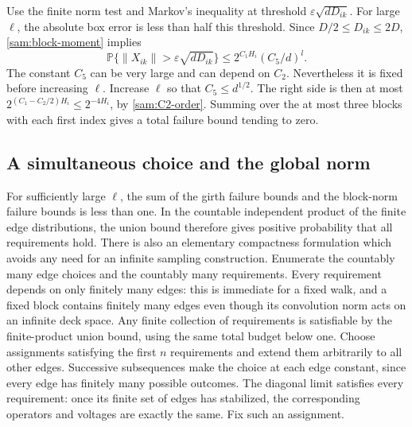 Use the finite norm test and Markov's inequality at threshold
\(\varepsilon\sqrt{dD_{ik}}\).  For large \(\ell\), the absolute
box error is less than half this threshold.  Since
\(D/2\le D_{ik}\le2D\), \eqref{sam:block-moment} implies
\begin{equation}\label{sam:block-probability}
 \mathbb P\{\|X_{ik}\|>
                   \varepsilon\sqrt{dD_{ik}}\}
 \le 2^{C_1H_i}(C_5/d)^l.
\end{equation}
The constant \(C_5\) can be very large and can depend on \(C_2\).
Nevertheless it is fixed before increasing \(\ell\).  Increase
\(\ell\) so that \(C_5\le d^{1/2}\).  The right side is then
at most
\(2^{(C_1-C_2/2)H_i}\le2^{-4H_i}\), by
\eqref{sam:C2-order}.  Summing over the at most three blocks with
each first index gives a total failure bound tending to zero.

\subsection{A simultaneous choice and the global norm}

For sufficiently large \(\ell\), the sum of the girth failure
bounds and the block-norm failure bounds is less than one.  In the
countable independent product of the finite edge distributions,
the union bound therefore gives positive probability that all
requirements hold.  There is also an elementary compactness
formulation which avoids any need for an infinite sampling
construction.  Enumerate the countably many edge choices and the
countably many requirements.  Every requirement depends on only
finitely many edges: this is immediate for a fixed walk, and a
fixed block contains finitely many edges even though its convolution
norm acts on an infinite deck space.  Any finite collection of
requirements is satisfiable by the finite-product union bound,
using the same total budget below one.  Choose assignments
satisfying the first \(n\) requirements and extend them arbitrarily
to all other edges.  Successive subsequences make the choice at
each edge constant, since every edge has finitely many possible
outcomes.  The diagonal limit satisfies every requirement: once
its finite set of edges has stabilized, the corresponding operators
and voltages are exactly the same.  Fix such an assignment.

